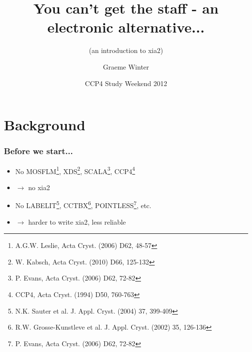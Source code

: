 \documentclass[slides,compress]{beamer}
\title{\huge You can't get the staff - an electronic alternative...}
\subtitle{\large (an introduction to xia2)}
\author{Graeme Winter}
\institute{Diamond Light Source}
\date{CCP4 Study Weekend 2012}
\begin{document}

\frame{\maketitle}


\section{Background}

\begin{frame}
\frametitle{Before we start...}
\begin{itemize}
\item{No 
MOSFLM\footnote{A.G.W. Leslie, Acta Cryst. (2006) D62, 48-57},
XDS\footnote{W. Kabsch, Acta Cryst. (2010) D66, 125-132}, 
SCALA\footnote{P. Evans, Acta Cryst. (2006) D62, 72-82}, 
CCP4\footnote{CCP4, Acta Cryst. (1994) D50, 760-763}
}
\item{$\rightarrow$ no xia2}
\item{No 
LABELIT\footnote{N.K. Sauter et al.
J. Appl. Cryst. (2004) 37, 399-409},
CCTBX\footnote{R.W. Grosse-Kunstleve et al.
J. Appl. Cryst. (2002) 35, 126-136},
POINTLESS\footnote{P. Evans, Acta Cryst. (2006) D62, 72-82}, 
etc.}
\item{$\rightarrow$ harder to write xia2, less reliable}
\end{itemize}
\end{frame}
\end{document}
